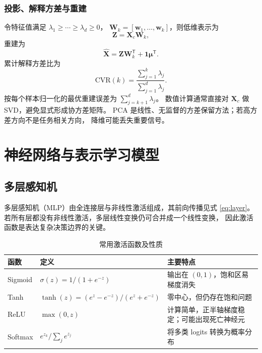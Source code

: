 \documentclass[UTF8,zihao=-4,a4paper,fontset=windows]{ctexart}
\begin{document}
\subsubsection{投影、解释方差与重建}

令特征值满足
$\lambda_1\ge\cdots\ge\lambda_d\ge0$，
$\bm{W}_k=[\bm{w}_1,\ldots,\bm{w}_k]$，则低维表示为
\begin{equation}
  \bm{Z}=\bm{X}_c\bm{W}_k,
\end{equation}
重建为
\begin{equation}
  \hat{\bm{X}}
  =\bm{Z}\bm{W}_k^{\mathsf T}
  +\bm{1}\bm{\mu}^{\mathsf T}.
\end{equation}
累计解释方差比为
\begin{equation}
  \mathrm{CVR}(k)
  =\frac{\sum_{j=1}^{k}\lambda_j}
  {\sum_{j=1}^{d}\lambda_j}.
\end{equation}
按每个样本归一化的最优重建误差为
$\sum_{j=k+1}^{d}\lambda_j$。
数值计算通常直接对 $\bm{X}_c$ 做 SVD，避免显式形成协方差矩阵。
PCA 是线性、无监督的方差保留方法；若高方差方向不是任务相关方向，
降维可能丢失重要信号。

\section{神经网络与表示学习模型}

\subsection{多层感知机}

多层感知机（MLP）由全连接层与非线性激活组成，其前向传播见式
\eqref{eq:layer}。若所有层都没有非线性激活，多层线性变换仍可合并成一个线性变换，
因此激活函数是表达复杂决策边界的关键。

\begin{table}[H]
\centering
\caption{常用激活函数及性质}
\begin{tabularx}{\textwidth}{L{2.2cm}L{4.7cm}Y}
\toprule
\textbf{函数} & \textbf{定义} & \textbf{主要特点}\\
\midrule
Sigmoid & $\sigma(z)=1/(1+e^{-z})$ & 输出在 $(0,1)$，饱和区易梯度消失\\
Tanh & $\tanh(z)=(e^z-e^{-z})/(e^z+e^{-z})$ & 零中心，但仍存在饱和问题\\
ReLU & $\max(0,z)$ & 计算简单，正半轴梯度稳定；可能出现死亡神经元\\
Softmax & $e^{z_k}/\sum_j e^{z_j}$ & 将多类 logits 转换为概率分布\\
\bottomrule
\end{tabularx}
\end{table}
\end{document}
